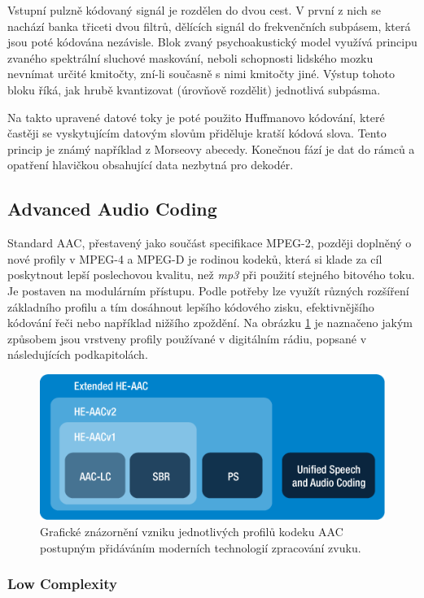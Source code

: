 Vstupní pulzně kódovaný signál je rozdělen do dvou cest. V první z nich se nachází banka třiceti dvou filtrů, dělících signál do frekvenčních subpásem, která jsou poté kódována nezávisle. Blok zvaný psychoakustický model využívá principu zvaného spektrální sluchové maskování, neboli schopnosti lidského mozku nevnímat určité kmitočty, zní-li současně s nimi kmitočty jiné. Výstup tohoto bloku říká, jak hrubě kvantizovat (úrovňově rozdělit) jednotlivá subpásma.

Na takto upravené datové toky je poté použito Huffmanovo kódování, které častěji se vyskytujícím datovým slovům přiděluje kratší kódová slova. Tento princip je známý například z Morseovy abecedy. Konečnou fází je  dat do rámců a opatření hlavičkou obsahující data nezbytná pro dekodér.
 
\subsection{Advanced Audio Coding}

Standard AAC, přestavený jako součást specifikace MPEG-2, později doplněný o nové profily v MPEG-4 \cite{iso:aac} a MPEG-D je rodinou kodeků, která si klade za cíl poskytnout lepší poslechovou kvalitu, než \textit{mp3} při použití stejného bitového toku. Je postaven na modulárním přístupu. Podle potřeby lze využít různých rozšíření základního profilu a tím dosáhnout lepšího kódového zisku, efektivnějšího kódování řeči nebo například nižšího zpoždění. Na obrázku \ref{pic:aac} je naznačeno jakým způsobem jsou vrstveny profily používané v digitálním rádiu, popsané v následujících podkapitolách.

\begin{figure}[h]
    \centering
    \includegraphics[width=.5\textwidth]{pic/aac.png}
    \caption{Grafické znázornění vzniku jednotlivých profilů kodeku AAC postupným přidáváním moderních technologií zpracování zvuku. \cite{web:voiceage} }
    \label{pic:aac}
\end{figure}

\subsubsection{Low Complexity}

